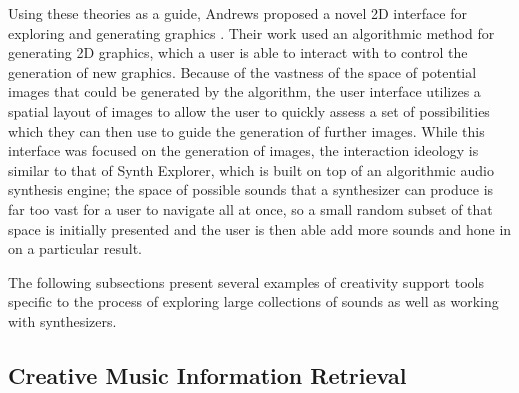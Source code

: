 Using these theories as a guide, Andrews proposed a novel 2D interface for exploring and generating graphics \cite{10.1145/3325480.3325506}. Their work used an algorithmic method for generating 2D graphics, which a user is able to interact with to control the generation of new graphics. Because of the vastness of the space of potential images that could be generated by the algorithm, the user interface utilizes a spatial layout of images to allow the user to quickly assess a set of possibilities which they can then use to guide the generation of further images. While this interface was focused on the generation of images, the interaction ideology is similar to that of Synth Explorer, which is built on top of an algorithmic audio synthesis engine; the space of possible sounds that a synthesizer can produce is far too vast for a user to navigate all at once, so a small random subset of that space is initially presented and the user is then able add more sounds and hone in on a particular result.

The following subsections present several examples of creativity support tools specific to the process of exploring large collections of sounds as well as working with synthesizers.

\subsection{Creative Music Information Retrieval}


